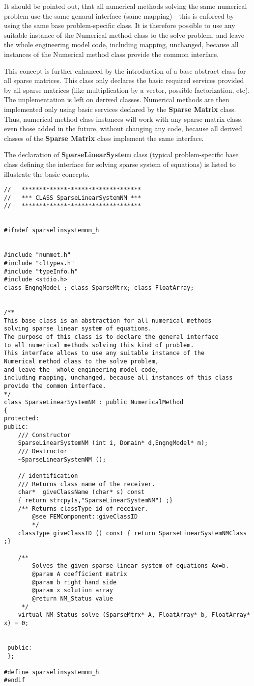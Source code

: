\documentclass[12pt,draft]{article}
\newcommand{\class}[1]{{\bf #1}}
\begin{document}
It should be pointed out, that all numerical methods solving the same
numerical problem use the same genaral interface (same mapping) - this is
enforced by using the same base problem-specific class. 
It is therefore possible to use any suitable
instance of the Numerical method class to the solve problem, and leave the  whole engineering model code,
including mapping, unchanged, because all instances of the Numerical
method class provide the common interface.

This concept is further enhanced by the introduction of a base abstract
class for all sparse matrices. This class only declares the basic
required services provided by all sparse matrices (like multiplication
by a vector, possible factorization, etc). The implementation is left on
derived classes.  Numerical methods are then implemented only
using basic services declared by the \class{Sparse Matrix} class. Thus, numerical
method class instances will work with any sparse matrix class, even
those added in the future, without changing any code, because all derived
classes of the \class{Sparse Matrix} class implement the same interface.

The declaration of \class{SparseLinearSystem} class (typical
problem-specific base class defining the interface for solving sparse
system of equations) is listed to
illustrate the basic concepts.
{\small\begin{verbatim}
//   **********************************
//   *** CLASS SparseLinearSystemNM ***
//   **********************************

 
#ifndef sparselinsystemnm_h


#include "nummet.h"
#include "cltypes.h"
#include "typeInfo.h"
#include <stdio.h>
class EngngModel ; class SparseMtrx; class FloatArray; 


/**
This base class is an abstraction for all numerical methods
solving sparse linear system of equations. 
The purpose of this class is to declare the general interface
to all numerical methods solving this kind of problem. 
This interface allows to use any suitable instance of the 
Numerical method class to the solve problem,
and leave the  whole engineering model code,
including mapping, unchanged, because all instances of this class
provide the common interface.
*/
class SparseLinearSystemNM : public NumericalMethod
{
protected:
public:
	/// Constructor
	SparseLinearSystemNM (int i, Domain* d,EngngModel* m);
	/// Destructor
	~SparseLinearSystemNM ();

	// identification 
	/// Returns class name of the receiver.
	char*  giveClassName (char* s) const 
	{ return strcpy(s,"SparseLinearSystemNM") ;}
	/** Returns classType id of receiver.
		@see FEMComponent::giveClassID 
		*/
	classType giveClassID () const { return SparseLinearSystemNMClass ;}

	/**
		Solves the given sparse linear system of equations Ax=b.
		@param A coefficient matrix 
		@param b right hand side
		@param x solution array
		@return NM_Status value
	 */
	virtual NM_Status solve (SparseMtrx* A, FloatArray* b, FloatArray* x) = 0;


 public:
 };

#define sparselinsystemnm_h
#endif
\end{verbatim}}
\end{document}
